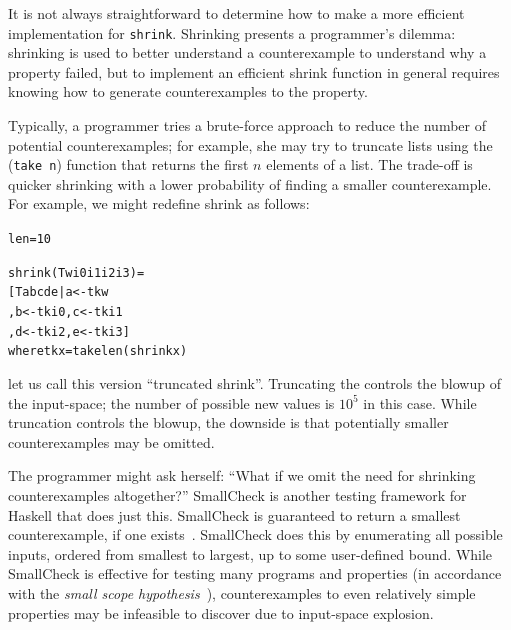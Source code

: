 \documentclass[10pt]{sigplanconf}
\newenvironment{code}{\begin{alltt}\small}{\end{alltt}}
\newcommand{\ttp}[1]{\texttt{#1}}
\begin{document}
It is not always straightforward to determine how to make a more efficient
implementation for \ttp{shrink}.  Shrinking presents a programmer's dilemma:
shrinking is used to better understand a counterexample to understand why a
property failed, but to implement an efficient shrink function in general
requires knowing how to generate counterexamples to the property.

Typically, a programmer tries a brute-force approach to reduce the number of
potential counterexamples; for example, she may try to truncate lists using the
(\ttp{take n}) function that returns the first $n$ elements of a list.  The
trade-off is quicker shrinking with a lower probability of finding a smaller
counterexample.  For example, we might redefine shrink as follows:
%
\begin{code}
len = 10

shrink (T w i0 i1 i2 i3) =
  [ T a b c d e | a <- tk w
                , b <- tk i0, c <- tk i1
                , d <- tk i2, e <- tk i3 ]
  where tk x = take len (shrink x)
\end{code}

%
\noindent
let us call this version ``truncated shrink''.  Truncating the controls the
blowup of the input-space; the number of possible new values is $10^5$ in this
case.  While truncation controls the blowup, the downside is that potentially
smaller counterexamples may be omitted.

The programmer might ask herself: ``What if we omit the need for shrinking
counterexamples altogether?''  SmallCheck is another testing framework for
Haskell that does just this.  SmallCheck is guaranteed to return a smallest
counterexample, if one exists~\cite{sc}.  SmallCheck does this by enumerating
all possible inputs, ordered from smallest to largest, up to some user-defined
bound.  While SmallCheck is effective for testing many programs and properties
(in accordance with the \emph{small scope hypothesis}~\cite{jackson}),
counterexamples to even relatively simple properties may be infeasible to
discover due to input-space explosion.

\end{document}
